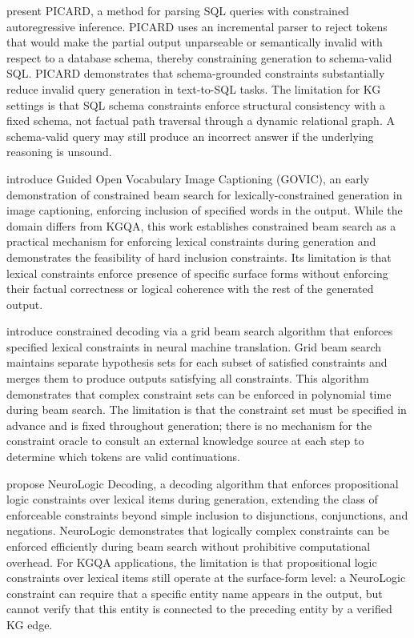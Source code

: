 \citet{scholak2021picard} present PICARD, a method for parsing SQL queries with constrained autoregressive inference. PICARD uses an incremental parser to reject tokens that would make the partial output unparseable or semantically invalid with respect to a database schema, thereby constraining generation to schema-valid SQL. PICARD demonstrates that schema-grounded constraints substantially reduce invalid query generation in text-to-SQL tasks. The limitation for KG settings is that SQL schema constraints enforce structural consistency with a fixed schema, not factual path traversal through a dynamic relational graph. A schema-valid query may still produce an incorrect answer if the underlying reasoning is unsound.

\citet{anderson2017guided} introduce Guided Open Vocabulary Image Captioning (GOVIC), an early demonstration of constrained beam search for lexically-constrained generation in image captioning, enforcing inclusion of specified words in the output. While the domain differs from KGQA, this work establishes constrained beam search as a practical mechanism for enforcing lexical constraints during generation and demonstrates the feasibility of hard inclusion constraints. Its limitation is that lexical constraints enforce presence of specific surface forms without enforcing their factual correctness or logical coherence with the rest of the generated output.

\citet{hokamp2017lexically} introduce constrained decoding via a grid beam search algorithm that enforces specified lexical constraints in neural machine translation. Grid beam search maintains separate hypothesis sets for each subset of satisfied constraints and merges them to produce outputs satisfying all constraints. This algorithm demonstrates that complex constraint sets can be enforced in polynomial time during beam search. The limitation is that the constraint set must be specified in advance and is fixed throughout generation; there is no mechanism for the constraint oracle to consult an external knowledge source at each step to determine which tokens are valid continuations.

\citet{lu2021neurologic} propose NeuroLogic Decoding, a decoding algorithm that enforces propositional logic constraints over lexical items during generation, extending the class of enforceable constraints beyond simple inclusion to disjunctions, conjunctions, and negations. NeuroLogic demonstrates that logically complex constraints can be enforced efficiently during beam search without prohibitive computational overhead. For KGQA applications, the limitation is that propositional logic constraints over lexical items still operate at the surface-form level: a NeuroLogic constraint can require that a specific entity name appears in the output, but cannot verify that this entity is connected to the preceding entity by a verified KG edge.

